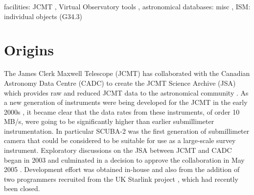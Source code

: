 \documentclass[final,authoryear,5p,times,twocolumn]{elsarticle}
\begin{document}
\begin{frontmatter}
\begin{abstract}
\end{abstract}

\begin{keyword}


facilities: JCMT \sep
Virtual Observatory tools \sep
astronomical databases: misc \sep
ISM: individual objects (G34.3)

\end{keyword}

\end{frontmatter}


\newcommand{\mnras}{MNRAS}
\newcommand{\aap}{A\&A}
\newcommand{\aaps}{A\&AS}
\newcommand{\pasp}{PASP}
\newcommand{\apj}{ApJ}
\newcommand{\apjs}{ApJS}
\newcommand{\qjras}{QJRAS}
\newcommand{\an}{Astron.\ Nach.}
\newcommand{\ijimw}{Int.\ J.\ Infrared \& Millimeter Waves}
\newcommand{\procspie}{Proc.\ SPIE}
\newcommand{\aspconf}{ASP Conf. Ser.}



\newcommand{\ascl}[1]{\href{http://www.ascl.net/#1}{ascl:#1}}


\section{Origins}

The James Clerk Maxwell Telescope (JCMT) has collaborated with the Canadian Astronomy Data Centre (CADC) to
create the JCMT Science Archive (JSA) which provides raw and reduced JCMT data to the astronomical community
\citep{2008SPIE.7016E..16G,2008ASPC..394..450E,2008ASPC..394..135G,2011ASPC..442..203E}.
As a new generation of instruments were being developed for the JCMT in
the early 2000s \citep[HARP/ACSIS \& SCUBA-2;][]{2000ASPC..217...33D,2003SPIE.4855....1H},
it became clear that
the data rates from these instruments, of order 10 MB/s, were going to be significantly
higher than earlier submillimeter instrumentation. In
particular SCUBA-2 was the first generation of submillimeter camera
that could be considered to be suitable for use as a large-scale
survey instrument. Exploratory discussions on the JSA between JCMT and CADC
began in 2003 and culminated in a decision to approve the
collaboration in May 2005 \citep{2005JCMTN23}. Development effort was
obtained in-house and also from the addition of two programmers recruited from
the UK Starlink project \citep{1982QJRAS..23..485D}, which had recently been closed.
\end{document}
